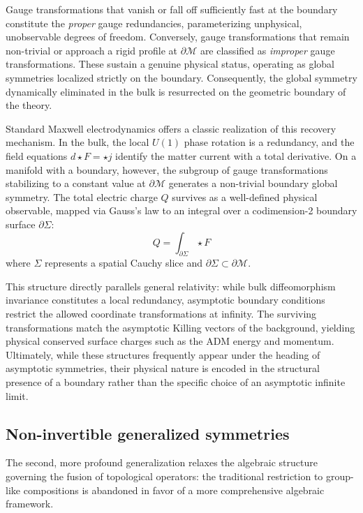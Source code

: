 \documentclass[aps,preprint,nofootinbib,preprintnumbers,eqsecnum,superscriptaddress]{revtex4}
\numberwithin{equation}{section}
\begin{document}
Gauge transformations that vanish or fall off sufficiently fast at the boundary constitute the \textit{proper} gauge redundancies, parameterizing unphysical, unobservable degrees of freedom. Conversely, gauge transformations that remain non-trivial or approach a rigid profile at $\partial \mathcal{M}$ are classified as \textit{improper} gauge transformations. These sustain a genuine physical status, operating as global symmetries localized strictly on the boundary. Consequently, the global symmetry dynamically eliminated in the bulk is resurrected on the geometric boundary of the theory.

Standard Maxwell electrodynamics offers a classic realization of this recovery mechanism. In the bulk, the local $U(1)$ phase rotation is a redundancy, and the field equations $d \star F = \star j$ identify the matter current with a total derivative. On a manifold with a boundary, however, the subgroup of gauge transformations stabilizing to a constant value at $\partial \mathcal{M}$ generates a non-trivial boundary global symmetry. The total electric charge $Q$ survives as a well-defined physical observable, mapped via Gauss's law to an integral over a codimension-2 boundary surface $\partial\Sigma$:
\begin{equation}
Q = \int_{\partial \Sigma} \star F
\end{equation}
where $\Sigma$ represents a spatial Cauchy slice and $\partial\Sigma \subset \partial\mathcal{M}$. 

This structure directly parallels general relativity: while bulk diffeomorphism invariance constitutes a local redundancy, asymptotic boundary conditions restrict the allowed coordinate transformations at infinity. The surviving transformations match the asymptotic Killing vectors of the background, yielding physical conserved surface charges such as the ADM energy and momentum. Ultimately, while these structures frequently appear under the heading of asymptotic symmetries, their physical nature is encoded in the structural presence of a boundary rather than the specific choice of an asymptotic infinite limit.

\subsection{Non-invertible generalized symmetries} \label{sec:non-inv_sym}

The second, more profound generalization relaxes the algebraic structure governing the fusion of topological operators: the traditional restriction to group-like compositions is abandoned in favor of a more comprehensive algebraic framework.
\end{document}
